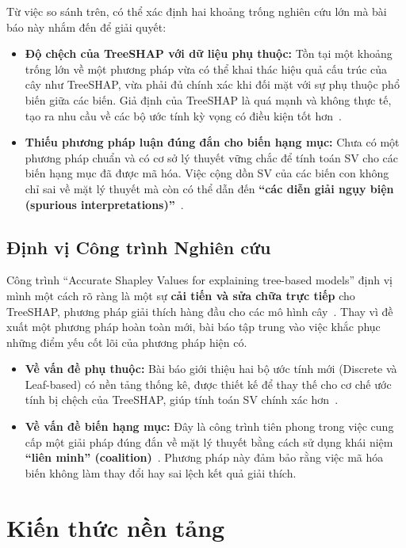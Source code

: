 \documentclass[12pt, a4paper]{article}
\begin{document}
Từ việc so sánh trên, có thể xác định hai khoảng trống nghiên cứu lớn mà bài báo này nhắm đến để giải quyết:
\begin{itemize}
    \item \textbf{Độ chệch của TreeSHAP với dữ liệu phụ thuộc:} Tồn tại một khoảng trống lớn về một phương pháp vừa có thể khai thác hiệu quả cấu trúc của cây như TreeSHAP, vừa phải đủ chính xác khi đối mặt với sự phụ thuộc phổ biến giữa các biến. Giả định của TreeSHAP là quá mạnh và không thực tế, tạo ra nhu cầu về các bộ ước tính kỳ vọng có điều kiện tốt hơn~\citep{ref_402}.
    \item \textbf{Thiếu phương pháp luận đúng đắn cho biến hạng mục:} Chưa có một phương pháp chuẩn và có cơ sở lý thuyết vững chắc để tính toán SV cho các biến hạng mục đã được mã hóa. Việc cộng dồn SV của các biến con không chỉ sai về mặt lý thuyết mà còn có thể dẫn đến \textbf{``các diễn giải ngụy biện (spurious interpretations)''}~\citep{ref_284}.
\end{itemize}

\subsection*{Định vị Công trình Nghiên cứu}

Công trình ``Accurate Shapley Values for explaining tree-based models'' định vị mình một cách rõ ràng là một sự \textbf{cải tiến và sửa chữa trực tiếp} cho TreeSHAP, phương pháp giải thích hàng đầu cho các mô hình cây~\citep{ref_282, ref_517}. Thay vì đề xuất một phương pháp hoàn toàn mới, bài báo tập trung vào việc khắc phục những điểm yếu cốt lõi của phương pháp hiện có.

\begin{itemize}
    \item \textbf{Về vấn đề phụ thuộc:} Bài báo giới thiệu hai bộ ước tính mới (Discrete và Leaf-based) có nền tảng thống kê, được thiết kế để thay thế cho cơ chế ước tính bị chệch của TreeSHAP, giúp tính toán SV chính xác hơn~\citep{ref_282, ref_404}.
    \item \textbf{Về vấn đề biến hạng mục:} Đây là công trình tiên phong trong việc cung cấp một giải pháp đúng đắn về mặt lý thuyết bằng cách sử dụng khái niệm \textbf{``liên minh'' (coalition)}~\citep{ref_283, ref_294}. Phương pháp này đảm bảo rằng việc mã hóa biến không làm thay đổi hay sai lệch kết quả giải thích.
\end{itemize}


\section{Kiến thức nền tảng}
\end{document}
